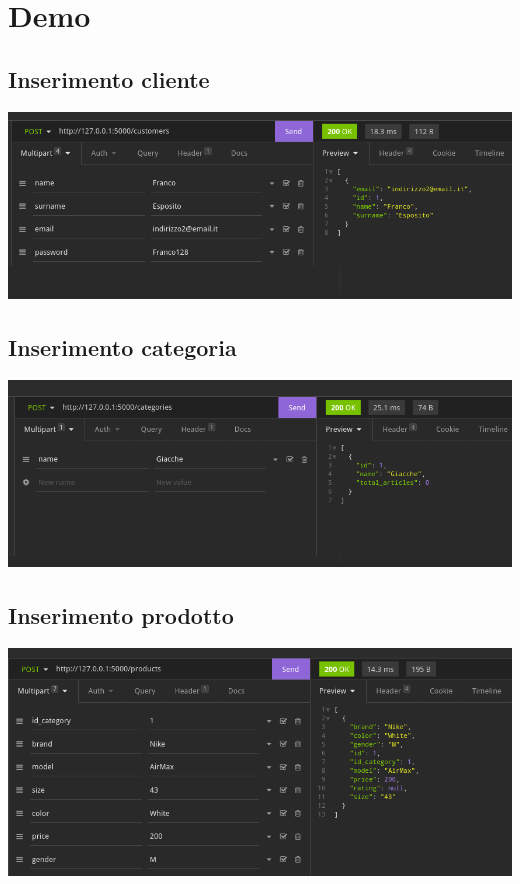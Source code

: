 \section{Demo}

\subsection{Inserimento cliente}
\begin{center}
\includegraphics[scale=0.45]{images/inserimento_cliente.png}
\end{center}
\subsection{Inserimento categoria}

\includegraphics[scale=0.45]{images/inserimento_categoria.png}

\subsection{Inserimento prodotto}

\includegraphics[scale=0.45]{images/inserimento_prodotto.png}

